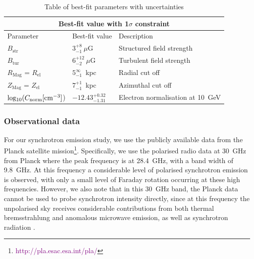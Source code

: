 \documentclass[usenatbib]{mnras}
\begin{document}
\begin{table}
\centering
\caption{Table of best-fit parameters with uncertainties}
\begin{tabular}{ |p{}|p{4.5cm}|p{6.5cm}|  }
\hline
\multicolumn{3}{|c|}{Best-fit value with 1$\sigma$ constraint} \\
\hline
\rule{0pt}{3ex}
Parameter & Best-fit value &Description \\
\hline
\hline
\rule{0pt}{3ex}
$B_{\mathrm{str}} $& $3_{-1}^{+8} ~ \mu$G & Structured field strength \\
\hline
\rule{0pt}{3ex}
$B_{\mathrm{tur}} $& $ 6_{-2}^{+12} ~\mu$G & Turbulent field strength\\
\hline
\rule{0pt}{3ex}
$R_{\mathrm{Mag}}$ = $R_{\mathrm{el}}$ & $5_{-1}^{\infty}$~kpc & Radial cut off \\
\hline
\rule{0pt}{3ex}
$Z_{\mathrm{Mag}}$ = $Z_{\mathrm{el}}$ & $7_{-1}^{+1}$~kpc & Azimuthal cut off\\
\hline
\rule{0pt}{3ex} 
${\rm{log_{10}}}(C_{\rm norm} [{\rm cm}^{-3}]$) & ${-12.43}_{{-1.31}}^{{+0.32}}$ & Electron normalisation at 10~GeV\\
\hline
\end{tabular}
\label{Para_table}
\end{table}

\subsubsection{Observational data}
For our synchrotron emission study, we use the publicly available data from the Planck satellite mission\footnote{\textcolor{purple}{http://pla.esac.esa.int/pla/}}. Specifically, we use the polarised radio data at 30~GHz from Planck where the peak frequency is at 28.4~GHz, with a band width of 9.8~GHz. At this frequency a considerable level of polarised synchrotron emission is observed, with only a small level of Faraday rotation occurring at these high frequencies. However, we also note that in this 30~GHz band, the Planck data cannot be used to probe synchrotron intensity directly, since at this frequency the unpolarised sky receives considerable contributions from both thermal bremsstrahlung and anomalous microwave emission, as well as synchrotron radiation \citep{Planck_XIX, Planck_X, Planck_XXV, Planck_XLII}. 
\end{document}
